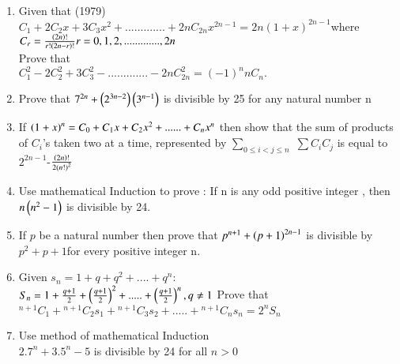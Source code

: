 \documentclass[journal,12pt,twocolumn]{IEEEtran}
\theoremstyle{remark}
\begin{document}
\begin{enumerate}
	\item Given that  \hfill{(1979)}
		    \\ $C_1+2C_2x+3C_3x^2+.............+2nC_{2n}x^{2n-1}= 2n(1+x)^{2n-1}$where $C_r=\frac{\left(2n\right)!}{r!\left(2n-r\right)!}\\  r=0,1,2,.............,2n$\\
 Prove that\\	$C^2_1-2C_2^2+3C_3^2-.............-2nC_{2n}^2  = (-1)^nnC_n.$ \\

	    \item Prove that $7^{2n} + \left(2^{3n-2}\right) \left(3^{n-1}\right) $ is divisible by 25 for any natural number n \hspace*{\fill}  \\

            \item If $\left(1+x\right)^n= C_0 + C_1x +C_2x^2+......+C_nx^n$ then show that the sum of products of $ C_i$'s taken
		    two at a time, represented by $\displaystyle\sum_{0 \leq i<j \leq n}$ $\displaystyle\sum C_i C_j$ is equal to $2^{2n-1}$-$\frac{\left(2n\right)!} {2\left(n!\right)^2}$ \hspace*{\fill} \\

	    \item Use mathematical Induction to prove : If n is any odd positive integer , then $n\left(n^2-1\right)$ is divisible by 24. \hspace*{\fill} \\

	    \item If $p$ be a natural number then prove that $p^{n+1}+\left(p+1\right)^{2n-1}$ is divisible by $p^2+p+1$for every positive integer n. \hspace*{\fill}  \\

            \item Given  $ s_n = 1 + q + q^2 +....+q^n:$\\
		    $S_n = 1 + \frac{q+1}{2}+\left(\frac{q+1}{2}\right)^2+.....+\left(\frac{q+1}{2}\right)^n,q\neq1$ Prove that\\
		    ${}^{n+1}C_1+{}^{n+1}C_2s_1+{}^{n+1}C_3s_2+.....+{}^{n+1}C_ns_n=2^nS_n$     \hspace*{\fill} \\
	    \item Use method of mathematical Induction\\$ 2.7^n +3.5^n-5$ is divisible by 24 for all $n>0$ \hspace*{\fill} \\


\end{enumerate}
\end{document}
